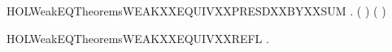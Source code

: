 \begin{SaveVerbatim}{HOLWeakEQTheoremsWEAKXXEQUIVXXPRESDXXBYXXSUM}
\HOLTokenTurnstile{} \HOLSymConst{\HOLTokenForall{}}   .
          \HOLSymConst{\HOLTokenConj{}}   \HOLSymConst{\HOLTokenConj{}}   \HOLSymConst{\HOLTokenConj{}}
          \HOLSymConst{\HOLTokenConj{}}   \HOLSymConst{\HOLTokenConj{}}   \HOLSymConst{\HOLTokenImp{}}
        ( \HOLSymConst{\ensuremath{+}} ) ( \HOLSymConst{\ensuremath{+}} )
\end{SaveVerbatim}
\newcommand{\HOLWeakEQTheoremsWEAKXXEQUIVXXPRESDXXBYXXSUM}{\UseVerbatim{HOLWeakEQTheoremsWEAKXXEQUIVXXPRESDXXBYXXSUM}}
\begin{SaveVerbatim}{HOLWeakEQTheoremsWEAKXXEQUIVXXREFL}
\HOLTokenTurnstile{} \HOLSymConst{\HOLTokenForall{}}.   
\end{SaveVerbatim}
\newcommand{\HOLWeakEQTheoremsWEAKXXEQUIVXXREFL}{\UseVerbatim{HOLWeakEQTheoremsWEAKXXEQUIVXXREFL}}
